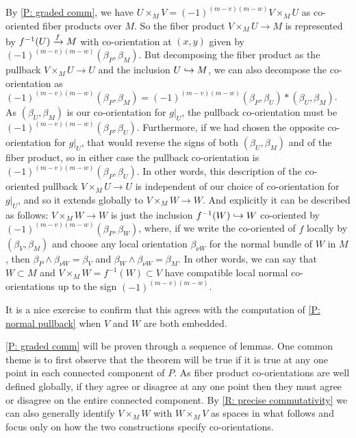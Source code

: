 \begin{example}
By \cref{P: graded comm}, we have  $U\times_MV=(-1)^{(m-v)(m-w)}V\times_MU$ as co-oriented fiber products over $M$. So the fiber product $V\times_MU\to M$ is represented by $f^{-1}(U)\xrightarrow{f}M$ with co-orientation at $(x,y)$ given by $(-1)^{(m-v)(m-w)}(\beta_P,\beta_M)$. But decomposing the fiber product as the pullback $V\times_M U\to U$ and the inclusion $U\hookrightarrow M$, we can also decompose the co-orientation as $(-1)^{(m-v)(m-w)}(\beta_P,\beta_M)=(-1)^{(m-v)(m-w)}(\beta_P,\beta_U)*(\beta_U,\beta_M)$. As $(\beta_U,\beta_M)$ is our co-orientation for $g|_U$, the pullback co-orientation must be $(-1)^{(m-v)(m-w)}(\beta_P,\beta_U)$. Furthermore, if we had chosen the opposite co-orientation for $g|_U$, that would reverse the signs of both $(\beta_U,\beta_M)$  and of the fiber product, so in either case the pullback co-orientation is $(-1)^{(m-v)(m-w)}(\beta_P,\beta_U)$. In other words, this description of the co-oriented pullback $V\times_MU\to U$ is independent of our choice of co-orientation for $g|_U$, and so it extends globally to $V\times_M W\to W$. And explicitly it can be described as follows:
$V\times_MW\to W$ is just the inclusion $f^{-1}(W)\hookrightarrow W$ co-oriented by $(-1)^{(m-v)(m-w)}(\beta_P,\beta_W)$, where, if we write the co-oriented of $f$ locally  by $(\beta_V,\beta_M)$ and choose any local orientation $\beta_{\nu W}$ for the normal bundle of $W$ in $M$, then $\beta_P\wedge \beta_{\nu W}=\beta_V$ and $\beta_W\wedge \beta_{\nu W}=\beta_M$. In other words, we can say that $W\subset M$ and $V\times_MW =f^{-1}(W)\subset V$ have compatible local normal co-orientations up to the sign $(-1)^{(m-v)(m-w)}$. 

It is a nice exercise to confirm that this agrees with the computation of \cref{P: normal pullback} when $V$ and $W$ are both embedded. 
\end{example}










\cref{P: graded comm} will be proven through a sequence of lemmas. One common theme is to first observe that the theorem will be true if it is true at any one point in each connected component of $P$. As fiber product co-orientations are well defined globally, if they agree or disagree at any one point then they must agree or disagree on the entire connected component. By 
\cref{R: precise commutativity}
 we can also generally identify  $V\times_M W$ with $W\times_MV$ as spaces in what follows and focus only on how the two constructions specify co-orientations.  


